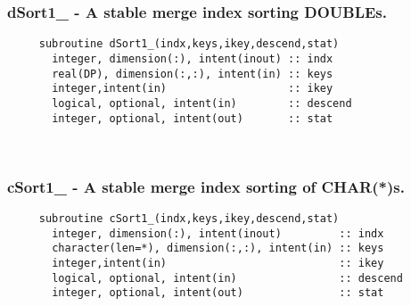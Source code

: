   \subsubsection{dSort1\_ - A stable merge index sorting DOUBLEs.}

\begin{verbatim} 
     subroutine dSort1_(indx,keys,ikey,descend,stat)
       integer, dimension(:), intent(inout) :: indx
       real(DP), dimension(:,:), intent(in) :: keys
       integer,intent(in)                   :: ikey
       logical, optional, intent(in)        :: descend
       integer, optional, intent(out)       :: stat
 \end{verbatim}%
 
 
\mbox{}\hrulefill\ 
 
  \subsubsection{cSort1\_ - A stable merge index sorting of CHAR(*)s.}

\begin{verbatim} 
     subroutine cSort1_(indx,keys,ikey,descend,stat)
       integer, dimension(:), intent(inout)         :: indx
       character(len=*), dimension(:,:), intent(in) :: keys
       integer,intent(in)                           :: ikey
       logical, optional, intent(in)                :: descend
       integer, optional, intent(out)               :: stat
 \end{verbatim}%


 
 
